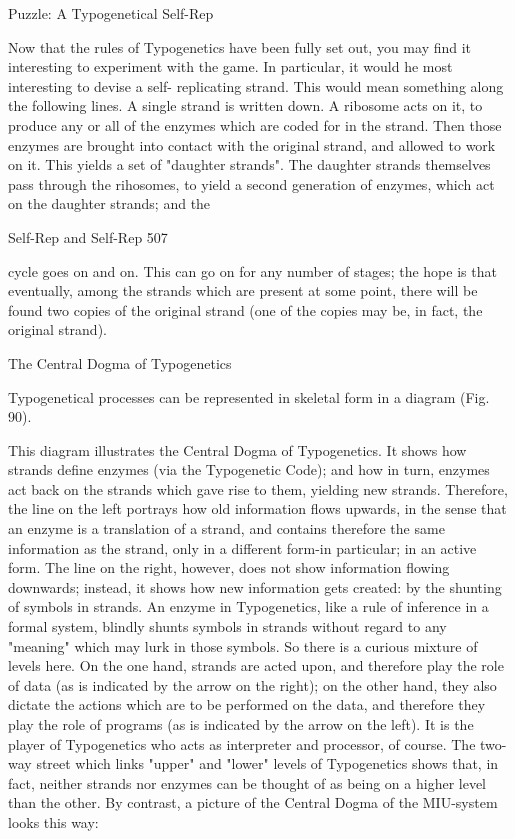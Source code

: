 {                               Puzzle: A Typogenetical Self-Rep

Now that the rules of Typogenetics have been fully set out, you may find it interesting to
experiment with the game. In particular, it would he most interesting to devise a self-
replicating strand. This would mean something along the following lines. A single strand is
written down. A ribosome acts on it, to produce any or all of the enzymes which are coded
for in the strand. Then those enzymes are brought into contact with the original strand, and
allowed to work on it. This yields a set of "daughter strands". The daughter strands
themselves pass through the rihosomes, to yield a second generation of enzymes, which act
on the daughter strands; and the




Self-Rep and Self-Rep                                                                          507

cycle goes on and on. This can go on for any number of stages; the hope is that eventually,
among the strands which are present at some point, there
will be found two copies of the original strand (one of the copies may be, in fact, the original
strand).

                            The Central Dogma of Typogenetics

Typogenetical processes can be represented in skeletal form in a diagram (Fig. 90).




This diagram illustrates the Central Dogma of Typogenetics. It shows how strands define
enzymes (via the Typogenetic Code); and how in turn, enzymes act back on the strands
which gave rise to them, yielding new strands. Therefore, the line on the left portrays how
old information flows upwards, in the sense that an enzyme is a translation of a strand, and
contains therefore the same information as the strand, only in a different form-in particular;
in an active form. The line on the right, however, does not show information flowing
downwards; instead, it shows how new information gets created: by the shunting of symbols
in strands.
        An enzyme in Typogenetics, like a rule of inference in a formal system, blindly
shunts symbols in strands without regard to any "meaning" which may lurk in those symbols.
So there is a curious mixture of levels here. On the one hand, strands are acted upon, and
therefore play the role of data (as is indicated by the arrow on the right); on the other hand,
they also dictate the actions which are to be performed on the data, and therefore they play
the role of programs (as is indicated by the arrow on the left). It is the player of Typogenetics
who acts as interpreter and processor, of course. The two-way street which links "upper" and
"lower" levels of Typogenetics shows that, in fact, neither strands nor enzymes can be
thought of as being on a higher level than the other. By contrast, a picture of the Central
Dogma of the MIU-system looks this way:




}
